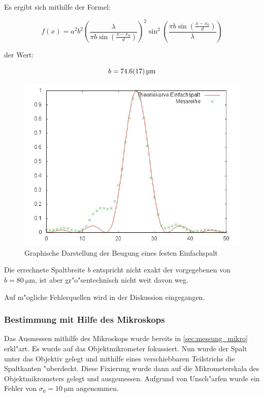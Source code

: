 			Es ergibt sich mithilfe der Formel:

			\begin{equation}
				f(x) = a^2 b^2 \left(\frac{\lambda}{\pi b \sin(\frac{x-x_\mathrm{0}}{d})}\right)^2 \sin^2 \left( \frac{\pi b \sin(\frac{x-x_\mathrm{0}}{d})}{\lambda} \right)
			\end{equation}

			der Wert:

			\begin{equation}
				b = \SI{74.6 (17)}{\micro \meter}
			\end{equation}

			

			\begin{figure}[H]
				\centering
				\includegraphics[width = 14cm]{graph1.jpg}
				\caption{Graphische Darstellung der Beugung eines festen Einfachspalt}
				\label{graph1}
			\end{figure}

			Die errechnete Spaltbreite $b$ entspricht nicht exakt der vorgegebenen von $b = \SI{80}{\micro \meter}$, ist aber gr"o"sentechnisch nicht weit davon weg.

			Auf m"ogliche Fehlerquellen wird in der Diskussion eingegangen.
			\newpage

		\subsubsection{Bestimmung mit Hilfe des Mikroskops}
			\label{sub:Bestimmung_mit_Hilfe_des_mikroskops}

			Das Ausmessen mithilfe des Mikroskops wurde bereits in \ref{sec:messung_mikro} erkl"art.
			Es wurde auf das Objektmikrometer fokussiert. Nun wurde der Spalt unter das Objektiv gelegt und mithilfe eines verschiebbaren Teilstrichs die Spaltkanten "uberdeckt. Diese Fixierung wurde dann auf die Mikrometerskala des Objektmikrometers gelegt und ausgemessen.
			Aufgrund von Unsch"arfen wurde ein Fehler von $\sigma_0 = \SI{10}{\micro \meter}$ angenommen.

